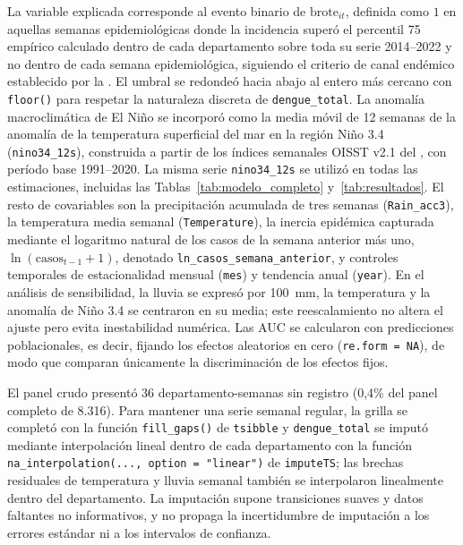 \documentclass[11pt,a4paper]{article}
\begin{document}
\medskip

La variable explicada corresponde al evento binario de $\text{brote}_{it}$, definida como $1$ en aquellas semanas epidemiológicas donde la incidencia superó el percentil 75 empírico calculado dentro de cada departamento sobre toda su serie 2014--2022 y no dentro de cada semana epidemiológica, siguiendo el criterio de canal endémico establecido por la \textcite{paho2002modulos}. El umbral se redondeó hacia abajo al entero más cercano con \texttt{floor()} para respetar la naturaleza discreta de \texttt{dengue\_total}. La anomalía macroclimática de El Niño se incorporó como la media móvil de 12 semanas de la anomalía de la temperatura superficial del mar en la región Niño 3.4 (\texttt{nino34\_12s}), construida a partir de los índices semanales OISST v2.1 del \textcite{noaa_cpc_weekly_sst}, con período base 1991--2020. La misma serie \texttt{nino34\_12s} se utilizó en todas las estimaciones, incluidas las Tablas~\ref{tab:modelo_completo} y~\ref{tab:resultados}. El resto de covariables son la precipitación acumulada de tres semanas (\texttt{Rain\_acc3}), la temperatura media semanal (\texttt{Temperature}), la inercia epidémica capturada mediante el logaritmo natural de los casos de la semana anterior más uno, $\ln(\text{casos}_{t-1}+1)$, denotado \texttt{ln\_casos\_semana\_anterior}, y controles temporales de estacionalidad mensual (\texttt{mes}) y tendencia anual (\texttt{year}). En el análisis de sensibilidad, la lluvia se expresó por 100~mm, la temperatura y la anomalía de Niño 3.4 se centraron en su media; este reescalamiento no altera el ajuste pero evita inestabilidad numérica. Las AUC se calcularon con predicciones poblacionales, es decir, fijando los efectos aleatorios en cero (\texttt{re.form = NA}), de modo que comparan únicamente la discriminación de los efectos fijos.

\medskip

El panel crudo presentó 36 departamento-semanas sin registro (0,4\% del panel completo de 8.316). Para mantener una serie semanal regular, la grilla se completó con la función \texttt{fill\_gaps()} de \texttt{tsibble} y \texttt{dengue\_total} se imputó mediante interpolación lineal dentro de cada departamento con la función \texttt{na\_interpolation(..., option = "linear")} de \texttt{imputeTS}; las brechas residuales de temperatura y lluvia semanal también se interpolaron linealmente dentro del departamento. La imputación supone transiciones suaves y datos faltantes no informativos, y no propaga la incertidumbre de imputación a los errores estándar ni a los intervalos de confianza.
\end{document}
